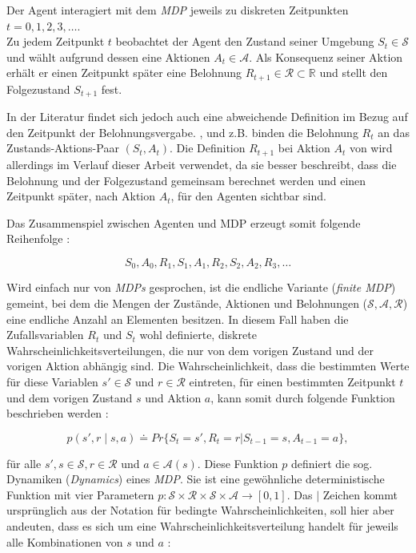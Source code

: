 Der Agent interagiert mit dem \textit{MDP} jeweils zu diskreten Zeitpunkten $t = 0, 1, 2, 3, \dots$. \\
Zu jedem Zeitpunkt $t$ beobachtet der Agent den Zustand seiner Umgebung $S_t \in \mathcal{S}$ und wählt aufgrund dessen eine Aktionen $A_t \in \mathcal{A}$. Als Konsequenz seiner Aktion erhält er einen Zeitpunkt später eine Belohnung $R_{t+1} \in \mathcal{R} \subset\mathbb{R} $ und stellt den Folgezustand $S_{t+1}$ fest. 
\par 
In der Literatur findet sich jedoch auch eine abweichende Definition im Bezug auf den Zeitpunkt der Belohnungsvergabe. \cite{watkins1989learning}, \cite{Wiering} und \cite{YuMDP} z.B. binden die Belohnung $R_t$ an das Zustands-Aktions-Paar $(S_t, A_t)$. Die  Definition $R_{t+1}$ bei Aktion $A _{t}$ von \cite{Sutton1998} wird allerdings im Verlauf dieser Arbeit verwendet, da sie besser beschreibt, dass die Belohnung und der Folgezustand gemeinsam berechnet werden und einen Zeitpunkt später, nach Aktion $A_t$, für den Agenten sichtbar sind.
\par 
Das Zusammenspiel zwischen Agenten und MDP erzeugt somit folgende Reihenfolge \cite[~S.48]{Sutton1998}:

\begin{equation}\label{eq:episode}
    S_0, A_0, R_1, S_1, A_1, R_2, S_2, A_2, R_3, \dots
\end{equation}

Wird einfach nur von \textit{MDPs} gesprochen, ist die endliche Variante (\textit{finite MDP}) gemeint, bei dem die Mengen der Zustände, Aktionen und Belohnungen ($\mathcal{S}, \mathcal{A}, \mathcal{R}$) eine endliche Anzahl an Elementen besitzen. In diesem Fall haben die Zufallsvariablen $R_t$ und $S_t$ wohl definierte, diskrete Wahrscheinlichkeitsverteilungen, die nur von dem vorigen Zustand und der vorigen Aktion abhängig sind. Die Wahrscheinlichkeit, dass die bestimmten Werte für diese Variablen $s' \in \mathcal{S}$ und $r \in \mathcal{R}$ eintreten, für einen bestimmten Zeitpunkt $t$ und dem vorigen Zustand $s$ und Aktion $a$, kann somit durch folgende Funktion beschrieben werden \cite[~S.48]{Sutton1998}:

\begin{equation}\label{eq:übergangsfunktion}
p(s',r \mid s,a) \doteq Pr\{S_t=s',R_t=r|S_{t-1}=s,A_{t-1}=a\},
\end{equation}

für alle $s', s \in \mathcal{S}, r \in \mathcal{R}$ und $a \in \mathcal{A}(s)$. Diese Funktion $p$ definiert die sog. Dynamiken (\textit{Dynamics}) eines \textit{MDP}. Sie ist eine gewöhnliche deterministische Funktion mit vier Parametern $p: \mathcal{S} \times \mathcal{R} \times \mathcal{S} \times \mathcal{A} \rightarrow [0,1]$. Das \glqq$\mid$\grqq{} Zeichen kommt ursprünglich aus der Notation für bedingte Wahrscheinlichkeiten, soll hier aber andeuten, dass es sich um eine Wahrscheinlichkeitsverteilung handelt für jeweils alle Kombinationen von $s$ und $a$ \cite[~S.49f]{Sutton1998}:

